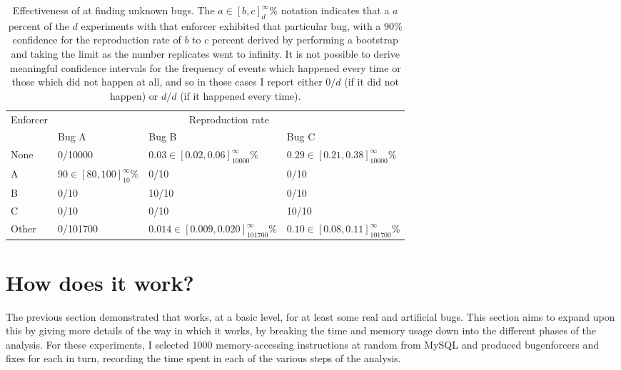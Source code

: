 \begin{table}
  {\hfill}
\begin{tabular}{|l|l|l|l|}
\hline
Enforcer & \multicolumn{3}{c|}{Reproduction rate} \\\cline{2-4}
         & Bug A                         & Bug B                                    & Bug C \\
\hline
None     & 0/10000                       & $0.03 \in [0.02,0.06]_{10000}^{\infty}\%$     & $0.29 \in [0.21,0.38]_{10000}^{\infty}\%$\\
\hdashline
A        & $90 \in [80,100]_{10}^{\infty}\%$ & 0/10                                     & 0/10 \\
B        & 0/10                          & 10/10                                    & 0/10 \\
C        & 0/10                          & 0/10                                     & 10/10 \\
\hdashline
Other    & 0/101700                      & $0.014 \in [0.009,0.020]_{101700}^{\infty}\%$ & $0.10 \in [0.08,0.11]_{101700}^{\infty}\%$ \\
\hline
\end{tabular}
  {\hfill}
\caption{Effectiveness of {\technique} at finding unknown bugs.  The
  $a \in [b,c]_{d}^{\infty}\%$ notation indicates that a $a$
  percent of the $d$ experiments with that enforcer exhibited that
  particular bug, with a 90\% confidence for the reproduction rate of
  $b$ to $c$ percent derived by performing a bootstrap and taking the
  limit as the number replicates went to infinity.  It is not possible
  to derive meaningful confidence intervals for the frequency of
  events which happened every time or those which did not happen at
  all, and so in those cases I report either $0/d$ (if it did not
  happen) or $d/d$ (if it happened every time).}
\label{tab:eval:does:finding_unknown}
\end{table}

\section{How does it work?}
\label{sect:eval:how_does_it_work}

The previous section demonstrated that {\technique} works, at a basic
level, for at least some real and artificial bugs.  This section aims
to expand upon this by giving more details of the way in which it
works, by breaking the time and memory usage down into the different
phases of the analysis.  For these experiments, I selected 1000
memory-accessing instructions at random from MySQL and produced
\glspl{bugenforcer} and fixes for each in turn, recording the time
spent in each of the various steps of the analysis.

